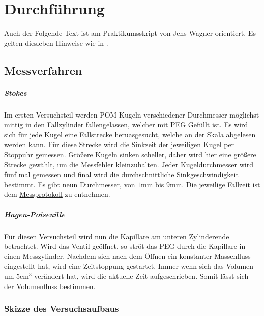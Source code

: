 \chapter{Durchführung} \label{ch:Durchfuehrung}

Auch der Folgende Text ist am Praktikumsskript von Jens Wagner orientiert. Es gelten diesleben Hinweise wie in .\cite{skriptPAP21,Duden}

\section{Messverfahren}
\label{sec:Messverfahren}

\paragraph{Stokes}
Im ersten Versuchsteil werden POM-Kugeln verschiedener Durchmesser möglichst mittig in den Fallzylinder fallengelassen, welcher mit PEG Gefüllt ist. Es wird sich für jede Kugel eine Fallstrecke heruasgesucht, welche an der Skala abgelesen werden kann. 
Für diese Strecke wird die Sinkzeit der jeweiligen Kugel per Stoppuhr gemessen. Größere Kugeln sinken scheller, daher wird hier eine größere Strecke gewählt, um die Messfehler kleinzuhalten. Jeder Kugeldurchmesser wird fünf mal gemessen und final wird die durchschnittliche Sinkgeschwindigkeit bestimmt. 
Es gibt neun Durchmesser, von $1\mathrm{mm}$ bis $9\mathrm{mm}$. Die jeweilige Fallzeit ist dem \hyperref[ch:Protokoll]{Messprotokoll} zu entnehmen.

\paragraph{Hagen-Poiseuille}
Für diesen Versuchsteil wird nun die Kapillare am unteren Zylinderende betrachtet. Wird das Ventil geöffnet, so ströt das PEG durch die Kapillare in einen Messzylinder. Nachdem sich nach dem Öffnen ein konstanter Massenfluss eingestellt hat, wird eine Zeitstoppung gestartet. Immer wenn sich das Volumen um $5 \mathrm{cm^3}$ verändert hat, wird die aktuelle Zeit aufgeschrieben. Somit lässt sich der Volumenfluss bestimmen.

\subsection*{Skizze des Versuchsaufbaus}
\label{sec:Skizze}

